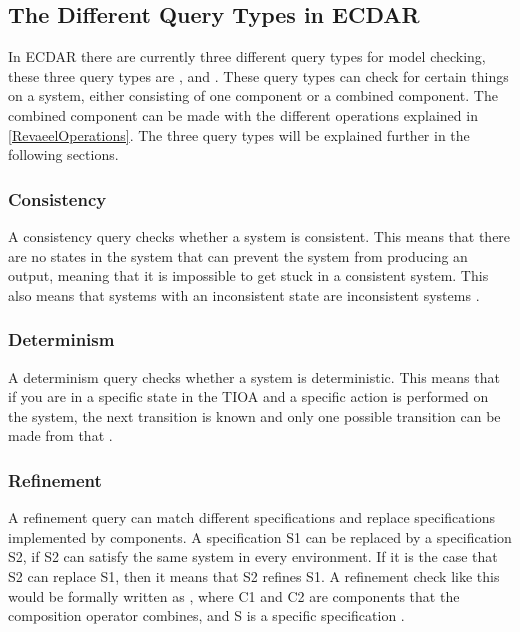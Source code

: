 \subsection{The Different Query Types in ECDAR}
In ECDAR there are currently three different query types for model checking, these three query types are ,  and . 
These query types can check for certain things on a system, either consisting of one component or a combined component. The combined component can be made with the different operations explained in \autoref{RevaeelOperations}. The three query types will be explained further in the following sections.

\subsubsection*{Consistency} \label{The-Different-Query-Types-In-Ecdar:Consistency}
A consistency query checks whether a system is consistent. 
This means that there are no states in the system that can prevent the system from producing an output, meaning that it is impossible to get stuck in a consistent system.
This also means that systems with an inconsistent state are inconsistent systems \cite{ecdartheory}.


\subsubsection*{Determinism} \label{The-Different-Query-Types-In-Ecdar:Determinism}
A determinism query checks whether a system is deterministic. 
This means that if you are in a specific state in the TIOA and a specific action is performed on the system, the next transition is known and only one possible transition can be made from that \cite{ecdartheory}.


\subsubsection*{Refinement} \label{The-Different-Query-Types-In-Ecdar:Refinement}
A refinement query can match different specifications and replace specifications implemented by components. 
A specification S1 can be replaced by a specification S2, if S2 can satisfy the same system in every environment. 
If it is the case that S2 can replace S1, then it means that S2 refines S1.
A refinement check like this would be formally written as , where C1 and C2 are components that the composition operator combines, and S is a specific specification \cite{ecdartheory}.

